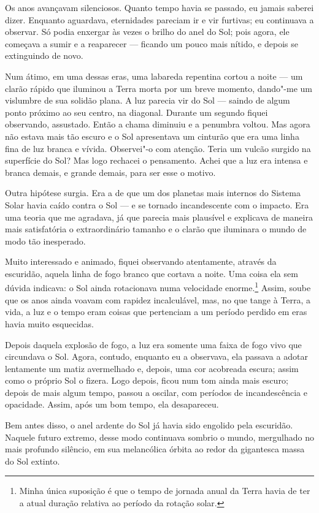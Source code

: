 Os anos avançavam silenciosos. Quanto tempo havia se passado, eu jamais saberei dizer. Enquanto aguardava,
eternidades pareciam ir e vir furtivas; eu continuava a observar. Só podia enxergar às vezes o brilho do anel do
Sol; pois agora, ele começava a sumir e a reaparecer --- ficando um pouco mais nítido, e depois se extinguindo de novo.

Num átimo, em uma dessas eras, uma labareda repentina cortou a noite --- um clarão rápido que iluminou a Terra morta por
um breve momento, dando"-me um vislumbre de sua solidão plana. A luz parecia vir do Sol --- saindo de algum ponto próximo
ao seu centro, na diagonal. Durante um segundo fiquei observando, assustado. Então a chama diminuiu e a penumbra
voltou. Mas agora não estava mais tão escuro e o Sol apresentava um cinturão que era uma linha fina de luz branca e
vívida. Observei"-o com atenção. Teria um vulcão surgido na superfície do Sol? Mas logo rechacei o pensamento. Achei que
a luz era intensa e branca demais, e grande demais, para ser esse o motivo.

Outra hipótese surgia. Era a de que um dos planetas mais internos do Sistema Solar havia caído contra o Sol --- e se
tornado incandescente com o impacto. Era uma teoria que me agradava, já que parecia mais plausível e explicava de
maneira mais satisfatória o extraordinário tamanho e o clarão que iluminara o mundo de modo tão inesperado.

Muito interessado e animado, fiquei observando atentamente, através da escuridão, aquela linha de fogo branco que
cortava a noite. Uma coisa ela sem dúvida indicava: o Sol ainda rotacionava
numa velocidade enorme.\footnote{ Minha única suposição é que o tempo de
jornada anual da Terra havia de ter a atual duração relativa ao período da rotação solar.} Assim, soube
que os anos ainda voavam com rapidez incalculável, mas, no que tange à Terra, a vida, a luz e o tempo eram coisas que
pertenciam a um período perdido em eras havia muito esquecidas.

Depois daquela explosão de fogo, a luz era somente uma faixa de fogo vivo que circundava o Sol. Agora, contudo,
enquanto eu a observava, ela passava a adotar lentamente um matiz avermelhado e, depois, uma cor acobreada escura;
assim como o próprio Sol o fizera. Logo depois, ficou num tom ainda mais escuro; depois de mais algum tempo, passou
a oscilar, com períodos de incandescência e opacidade. Assim, após um bom tempo, ela desapareceu.

Bem antes disso, o anel ardente do Sol já havia sido engolido pela escuridão. Naquele futuro extremo, desse modo continuava
sombrio o mundo, mergulhado no mais profundo silêncio, em sua melancólica órbita ao redor da gigantesca massa do Sol
extinto.

